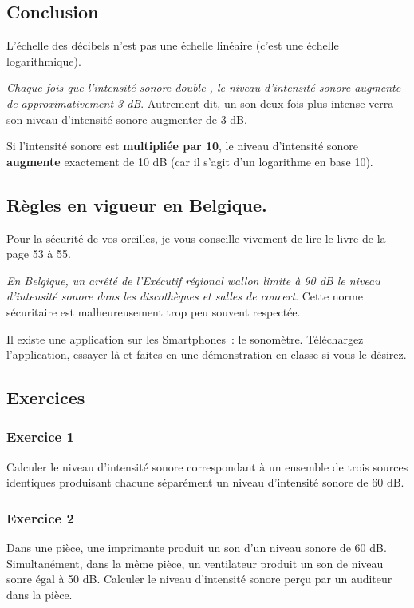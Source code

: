 \subsection{Conclusion}

L'échelle des décibels n'est pas une échelle linéaire (c'est une échelle
logarithmique).

\emph{Chaque fois que l'intensité sonore double , le niveau
d'intensité sonore augmente de approximativement 3 dB}. Autrement dit,
un son deux fois plus intense verra son niveau d'intensité sonore
augmenter de 3 dB.

Si l'intensité sonore est \textbf{multipliée par 10}, le niveau
d'intensité sonore \textbf{augmente} exactement de 10 dB (car il s'agit
d'un logarithme en base 10).

\subsection{Règles
en vigueur en Belgique. }

Pour la sécurité de vos oreilles, je vous conseille vivement de lire
le livre de la page 53 à 55.

\emph{En Belgique, un arrêté de l'Exécutif régional wallon
limite à 90 dB le niveau d'intensité sonore dans les discothèques et
salles de concert}. Cette norme sécuritaire est malheureusement trop
peu souvent respectée.

Il existe une application sur les Smartphones~: le sonomètre.
Téléchargez l'application, essayer là et faites en une démonstration en classe si vous le désirez.

\subsection{Exercices}

\subsubsection{Exercice 1}
 Calculer le niveau d'intensité sonore correspondant à un ensemble de
trois sources identiques produisant chacune séparément un niveau
d'intensité sonore de 60 dB.

\subsubsection{Exercice 2}

Dans une pièce, une imprimante produit un son d'un niveau sonore de
60 dB. Simultanément, dans la même pièce, un ventilateur produit un son
de niveau sonre égal à 50 dB. Calculer le niveau d'intensité sonore
perçu par un auditeur dans la pièce.


